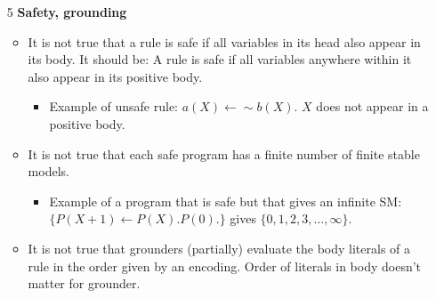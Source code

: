 \documentclass[9pt,a4paper,landscape]{article}
\begin{document}
{\begin{itemize}
	\item[5] \textbf{Safety, grounding}
	\begin{itemize}[noitemsep]
		\item It is not true that a rule is safe if all variables in its head also appear in its body. It should be: A rule is safe if all variables anywhere within it also appear in its positive body.
		\begin{itemize}[noitemsep]
			\item Example of unsafe rule: $a(X) \leftarrow \sim b(X)$. $X$ does not appear in a positive body.
		\end{itemize}
		\item It is not true that each safe program has a finite number of finite stable models.
		\begin{itemize}[noitemsep]
			\item Example of a program that is safe but that gives an infinite SM: $\{ P(X+1) \leftarrow P(X). P(0). \}$ gives $\{0, 1, 2, 3, \ldots, \infty \}$.
		\end{itemize}
		\item It is not true that grounders (partially) evaluate the body literals of a rule in the order given by an encoding. Order of literals in body doesn't matter for grounder.
	\end{itemize}
	
	\pagebreak
	

\end{itemize}}
\end{document}
